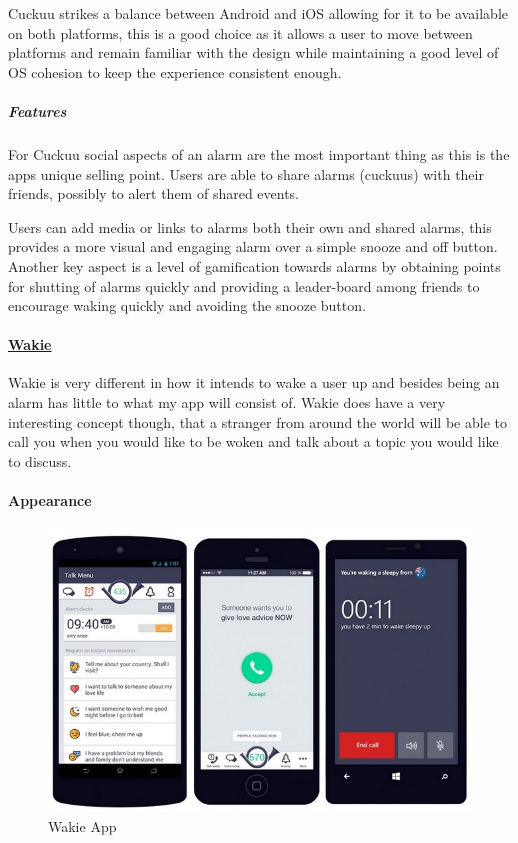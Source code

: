 Cuckuu strikes a balance between Android and iOS allowing for it to be
available on both platforms, this is a good choice as it allows a user
to move between platforms and remain familiar with the design while
maintaining a good level of OS cohesion to keep the experience
consistent enough.

\subparagraph{Features}\label{features-1}

For Cuckuu social aspects of an alarm are the most important thing as
this is the apps unique selling point. Users are able to share alarms
(cuckuus) with their friends, possibly to alert them of shared events.

Users can add media or links to alarms both their own and shared alarms,
this provides a more visual and engaging alarm over a simple snooze and
off button. Another key aspect is a level of gamification towards alarms
by obtaining points for shutting of alarms quickly and providing a
leader-board among friends to encourage waking quickly and avoiding the
snooze button.

\paragraph{\texorpdfstring{\href{https://wakie.com/}{Wakie}}{Wakie}}\label{wakie}

Wakie is very different in how it intends to wake a user up and besides
being an alarm has little to what my app will consist of. Wakie does
have a very interesting concept though, that a stranger from around the
world will be able to call you when you would like to be woken and talk
about a topic you would like to discuss.

\paragraph{Appearance}\label{appearance-2}

\begin{figure}
\centering
\includegraphics{Images/wakie.jpg}
\caption{Wakie App}
\end{figure}

